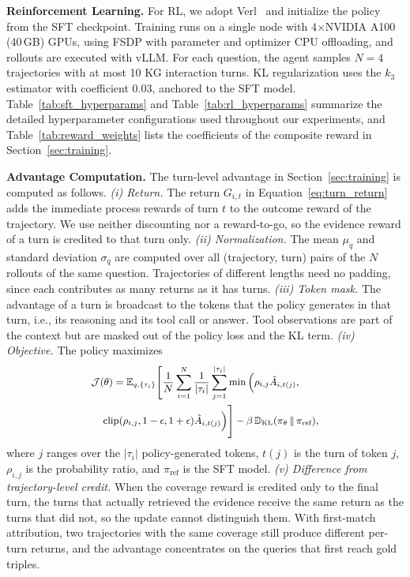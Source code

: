 

\textbf{Reinforcement Learning.}
\label{app:rl}
For RL, we adopt Verl~\cite{sheng2025hybridflow} and initialize the policy from the SFT checkpoint. Training runs on a single node with 4$\times$NVIDIA A100 (40\,GB) GPUs, using FSDP with parameter and optimizer CPU offloading, and rollouts are executed with vLLM. For each question, the agent samples $N{=}4$ trajectories with at most 10 KG interaction turns. KL regularization uses the $k_3$ estimator with coefficient 0.03, anchored to the SFT model. Table~\ref{tab:sft_hyperparams} and Table~\ref{tab:rl_hyperparams} summarize the detailed hyperparameter configurations used throughout our experiments, and Table~\ref{tab:reward_weights} lists the coefficients of the composite reward in Section~\ref{sec:training}.

\textbf{Advantage Computation.}
\label{app:advantage}
The turn-level advantage in Section~\ref{sec:training} is computed as follows.
\textit{(i) Return.} The return $G_{i,t}$ in Equation~\ref{eq:turn_return} adds the immediate process rewards of turn $t$ to the outcome reward of the trajectory. We use neither discounting nor a reward-to-go, so the evidence reward of a turn is credited to that turn only.
\textit{(ii) Normalization.} The mean $\mu_q$ and standard deviation $\sigma_q$ are computed over all (trajectory, turn) pairs of the $N$ rollouts of the same question. Trajectories of different lengths need no padding, since each contributes as many returns as it has turns.
\textit{(iii) Token mask.} The advantage of a turn is broadcast to the tokens that the policy generates in that turn, i.e., its reasoning and its tool call or answer. Tool observations are part of the context but are masked out of the policy loss and the KL term.
\textit{(iv) Objective.} The policy maximizes
\begin{equation}
\small
\begin{aligned}
&\mathcal{J}(\theta)
= \mathbb{E}_{q,\{\tau_i\}}
\Bigg[
\frac{1}{N}\sum_{i=1}^{N}\frac{1}{|\tau_i|}\sum_{j=1}^{|\tau_i|}
\min \Big(
\rho_{i,j}\hat{A}_{i,t(j)}, \\
&\quad\operatorname{clip}(\rho_{i,j}, 1-\epsilon, 1+\epsilon)\hat{A}_{i,t(j)}
\Big)
\Bigg]
- \beta \,\mathbb{D}_{\mathrm{KL}}(\pi_{\theta}\,\|\,\pi_{\text{ref}}),
\end{aligned}
\end{equation}
where $j$ ranges over the $|\tau_i|$ policy-generated tokens, $t(j)$ is the turn of token $j$, $\rho_{i,j}$ is the probability ratio, and $\pi_{\text{ref}}$ is the SFT model.
\textit{(v) Difference from trajectory-level credit.} When the coverage reward is credited only to the final turn, the turns that actually retrieved the evidence receive the same return as the turns that did not, so the update cannot distinguish them. With first-match attribution, two trajectories with the same coverage still produce different per-turn returns, and the advantage concentrates on the queries that first reach gold triples.

